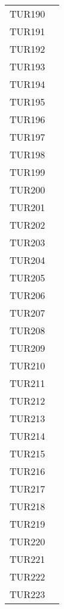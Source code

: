 \documentclass[PianoDiQualifica.tex]{subfiles}
\begin{document}
\begin{longtable}[H]{P{5cm}P{9cm}}
	TUR190 &  \\
	TUR191 &  \\
	TUR192 &  \\
	TUR193 &  \\
	TUR194 &  \\
	TUR195 &  \\
	TUR196 &  \\
	TUR197 &  \\
	TUR198 &  \\
	TUR199 &  \\
	TUR200 &  \\
	TUR201 &  \\
	TUR202 &  \\
	TUR203 &  \\
	TUR204 &  \\
	TUR205 &  \\
	TUR206 &  \\
	TUR207 &  \\
	TUR208 &  \\
	TUR209 &  \\
	TUR210 &  \\
	TUR211 &  \\
	TUR212 &  \\
	TUR213 &  \\
	TUR214 &  \\
	TUR215 &  \\
	TUR216 &  \\
	TUR217 &  \\
	TUR218 &  \\
	TUR219 &  \\
	TUR220 &  \\
	TUR221 &  \\
	TUR222 &  \\
	TUR223 &  \\
	

\end{longtable}
\end{document}
